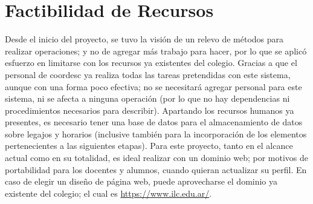 \section{Factibilidad de Recursos}
\normalsize{ \indent
Desde el inicio del proyecto, se tuvo la visión de un relevo
de métodos para realizar operaciones; y no de agregar más
trabajo para hacer, por lo que se aplicó esfuerzo en
limitarse con los recursos ya existentes del colegio.
Gracias a que el personal de \Gls{coordesc} ya realiza
todas las tareas pretendidas con este sistema, aunque con
una forma poco efectiva; no se necesitará agregar personal
para este sistema, ni se afecta a ninguna operación (por lo
que no hay dependencias ni procedimientos necesarios para
describir).
}
\newline
\normalsize{ \indent
Apartando los recursos humanos ya presentes, es necesario
tener una base de datos para el almacenamiento de datos
sobre legajos y horarios (inclusive también para la
incorporación de los elementos pertenecientes a las
siguientes etapas). Para este proyecto, tanto en el
alcance actual como en su totalidad, es ideal realizar
con un dominio web; por motivos de portabilidad para los
docentes y alumnos, cuando quieran actualizar su perfil.
En caso de elegir un diseño de página web, puede
aprovecharse el dominio ya existente del colegio; el cual
es \url{https://www.ilc.edu.ar/}.
}
